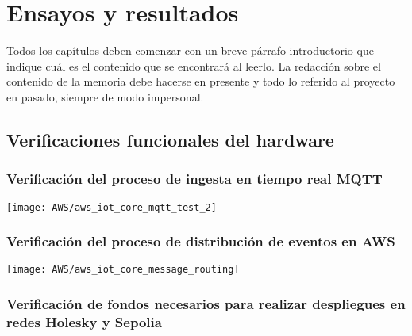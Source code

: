 
\chapter{Ensayos y resultados} %

\label{Chapter4} %
Todos los capítulos deben comenzar con un breve párrafo introductorio que indique cuál es el contenido que se encontrará al leerlo.  La redacción sobre el contenido de la memoria debe hacerse en presente y todo lo referido al proyecto en pasado, siempre de modo impersonal.


\section{Verificaciones funcionales del hardware}

\subsection{Verificación del proceso de ingesta en tiempo real MQTT}


\begin{center}
   \texttt{[image: AWS/aws\_iot\_core\_mqtt\_test\_2]}
   \label{fig:aws_iot_core_mqtt_test_2}
\end{center}

\subsection{Verificación del proceso de distribución de eventos en AWS}


\begin{center}
   \texttt{[image: AWS/aws\_iot\_core\_message\_routing]}
   \label{fig:aws_iot_core_message_routing}
\end{center}


\subsection{Verificación de fondos necesarios para realizar despliegues en redes Holesky y Sepolia}


